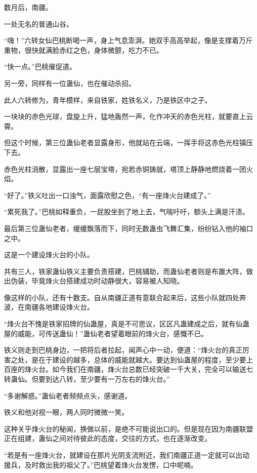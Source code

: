 
\begin{this_body}

数月后，南疆。

一处无名的普通山谷。

“嗨！”六转女仙巴桃断喝一声，身上气息澎湃。她双手高高举起，像是支撑着万斤重物，很快就满脸赤红之色，身体微颤，吃力不已。

“快一点。”巴桃催促道。

另一旁，同样有一位蛊仙，也在催动杀招。

此人六转修为，青年模样，来自铁家，姓铁名义，乃是铁区中之子。

一块块的赤色光球，盘旋上升，猛地轰然一声，化作冲天的赤色光柱，就要直上云霄。

但这个时候，第三位蛊仙老者显露身形，他就站在云端，一挥手将这赤色光柱镇压下去。

赤色光柱消散，显露出一座七层宝塔，宛若赤铜铸就，塔顶上静静地燃烧着一团火焰。

“好了。”铁义吐出一口浊气，面露欣慰之色，“有一座烽火台建成了。”

“累死我了。”巴桃如释重负，一屁股坐到了地上去，气喘吁吁，额头上满是汗渍。

最后第三位蛊仙老者，缓缓飘落而下，同时无数蛊虫飞舞汇集，纷纷钻入他的袖口之中。

这是一个建设烽火台的小队。

共有三人，铁家蛊仙铁义主要负责搭建，巴桃辅助，而蛊仙老者则是布置大阵，做出伪装，毕竟烽火台搭建成功时动静很大，容易被人知晓。

像这样的小队，还有十数支。自从南疆正道有意联合起来后，这些小队就四处奔波，在南疆各地建设烽火台。

“烽火台不愧是铁家招牌的仙蛊屋，真是不可思议，区区凡蛊建成之后，就有仙蛊屋的威能，可传送蛊仙！”蛊仙老者望着眼前的烽火台，感慨不已。

铁义则走到巴桃身边，一把将后者拉起，闻声心中一动，便道：“烽火台的真正厉害之处，是在于建设的越多，总体的威能就越大。要达到仙蛊屋的程度，至少要上百座的烽火台。如今我们在南疆，烽火台总数已经突破一千大关，完全可以输送七转蛊仙。但要到达八转，至少要有一万左右的烽火台。”

“多谢解惑。”蛊仙老者频频点头，感谢道。

铁义和他对视一眼，两人同时微微一笑。

这种关乎烽火台的秘闻，换做以前，是绝不可能说出口的。但是现在因为南疆联盟正在组建，蛊仙之间对待彼此的态度，交往的方式，也在逐渐改变。

“若是有一座烽火台，就建设在那片光阴支流附近，我们南疆正道一定就可以出动援兵，及时救出我的祖父了。”巴桃望着烽火台发愣，口中呢喃。


\end{this_body}
